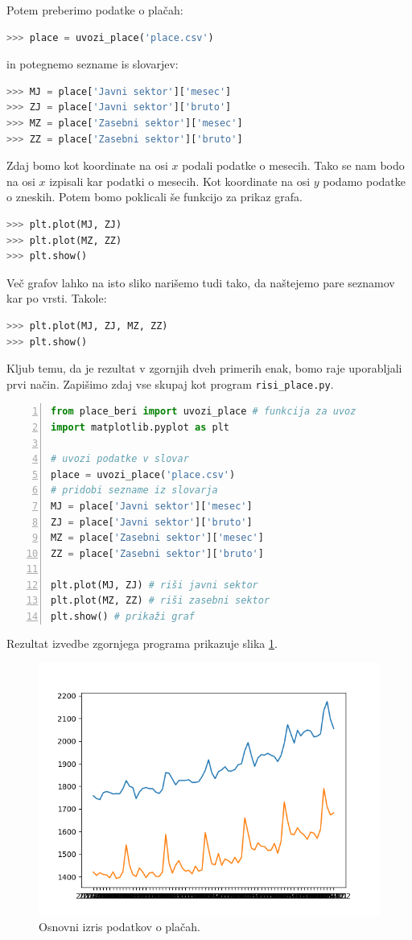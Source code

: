 Potem preberimo podatke o plačah:
\begin{lstlisting}[language=Python]
>>> place = uvozi_place('place.csv')
\end{lstlisting}
in potegnemo sezname is slovarjev:
\begin{lstlisting}[language=Python]
>>> MJ = place['Javni sektor']['mesec']
>>> ZJ = place['Javni sektor']['bruto']
>>> MZ = place['Zasebni sektor']['mesec']
>>> ZZ = place['Zasebni sektor']['bruto']
\end{lstlisting}
Zdaj bomo kot koordinate na osi $x$ podali podatke o mesecih. Tako se nam bodo na osi $x$ izpisali kar podatki o mesecih. Kot koordinate na osi $y$ podamo podatke o zneskih. Potem bomo poklicali še funkcijo za prikaz grafa.
\begin{lstlisting}[language=Python, showstringspaces=false]
>>> plt.plot(MJ, ZJ)
>>> plt.plot(MZ, ZZ)
>>> plt.show()
\end{lstlisting}
Več grafov lahko na isto sliko narišemo tudi tako, da naštejemo pare seznamov kar po vrsti. Takole: 
\begin{lstlisting}[language=Python, showstringspaces=false]
>>> plt.plot(MJ, ZJ, MZ, ZZ)
>>> plt.show()
\end{lstlisting}
Kljub temu, da je rezultat v zgornjih dveh primerih enak, bomo raje uporabljali prvi način.
Zapišimo zdaj vse skupaj kot program \texttt{risi\_place.py}.
\begin{lstlisting}[language=Python,numbers=left]
from place_beri import uvozi_place # funkcija za uvoz
import matplotlib.pyplot as plt 

# uvozi podatke v slovar
place = uvozi_place('place.csv')
# pridobi sezname iz slovarja
MJ = place['Javni sektor']['mesec']
ZJ = place['Javni sektor']['bruto']
MZ = place['Zasebni sektor']['mesec']
ZZ = place['Zasebni sektor']['bruto']

plt.plot(MJ, ZJ) # riši javni sektor
plt.plot(MZ, ZZ) # riši zasebni sektor
plt.show() # prikaži graf
\end{lstlisting}
Rezultat izvedbe zgornjega programa prikazuje slika \ref{img:plt3}.
\begin{figure}
    \includegraphics[width=\linewidth]{img/plt3.png}
    \caption{Osnovni izris podatkov o plačah.}
    \label{img:plt3}
\end{figure}

